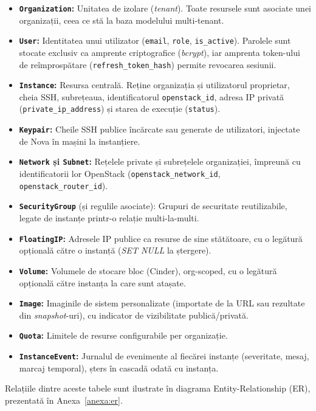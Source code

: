 \begin{itemize}
    \item \textbf{\texttt{Organization}:} Unitatea de izolare (\textit{tenant}). Toate resursele sunt asociate unei organizații, ceea ce stă la baza modelului multi-tenant.
    \item \textbf{\texttt{User}:} Identitatea unui utilizator (\texttt{email}, \texttt{role}, \texttt{is\_active}). Parolele sunt stocate exclusiv ca amprente criptografice (\textit{bcrypt}), iar amprenta token-ului de reîmprospătare (\texttt{refresh\_token\_hash}) permite revocarea sesiunii.
    \item \textbf{\texttt{Instance}:} Resursa centrală. Reține organizația și utilizatorul proprietar, cheia SSH, subrețeaua, identificatorul \texttt{openstack\_id}, adresa IP privată (\texttt{private\_ip\_address}) și starea de execuție (\texttt{status}).
    \item \textbf{\texttt{Keypair}:} Cheile SSH publice încărcate sau generate de utilizatori, injectate de Nova în mașini la instanțiere.
    \item \textbf{\texttt{Network} și \texttt{Subnet}:} Rețelele private și subrețelele organizației, împreună cu identificatorii lor OpenStack (\texttt{openstack\_network\_id}, \texttt{openstack\_router\_id}).
    \item \textbf{\texttt{SecurityGroup}} (și regulile asociate): Grupuri de securitate reutilizabile, legate de instanțe printr-o relație multi-la-multi.
    \item \textbf{\texttt{FloatingIP}:} Adresele IP publice ca resurse de sine stătătoare, cu o legătură opțională către o instanță (\textit{SET NULL} la ștergere).
    \item \textbf{\texttt{Volume}:} Volumele de stocare bloc (Cinder), org-scoped, cu o legătură opțională către instanța la care sunt atașate.
    \item \textbf{\texttt{Image}:} Imaginile de sistem personalizate (importate de la URL sau rezultate din \textit{snapshot}-uri), cu indicator de vizibilitate publică/privată.
    \item \textbf{\texttt{Quota}:} Limitele de resurse configurabile per organizație.
    \item \textbf{\texttt{InstanceEvent}:} Jurnalul de evenimente al fiecărei instanțe (severitate, mesaj, marcaj temporal), șters în cascadă odată cu instanța.
\end{itemize}

Relațiile dintre aceste tabele sunt ilustrate în diagrama Entity-Relationship (ER), prezentată în Anexa~\ref{anexa:er}.

